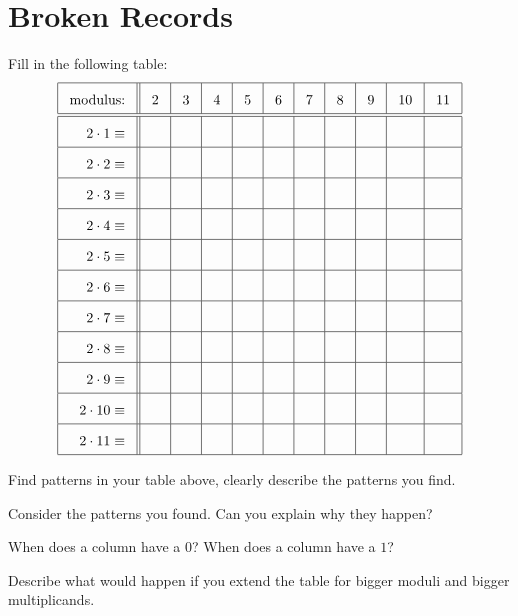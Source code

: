 \newpage
\section{Broken Records}\label{A:orderMod}

Fill in the following table:
\[
{\renewcommand{\arraystretch}{1.8}
\renewcommand{\arraycolsep}{3mm}
\begin{array}{|r||c|c|c|c|c|c|c|c|c|c|}\hline
\text{modulus:} & 2 & 3 & 4 & 5 & 6 & 7 & 8 & 9 & 10 & 11 \\ \hline\hline
2\cdot 1 \equiv & & & & & & & & & & \\ \hline
2\cdot 2 \equiv & & & & & & & & & & \\ \hline
2\cdot 3 \equiv & & & & & & & & & & \\ \hline
2\cdot 4 \equiv & & & & & & & & & & \\ \hline
2\cdot 5 \equiv & & & & & & & & & & \\ \hline
2\cdot 6 \equiv & & & & & & & & & & \\ \hline
2\cdot 7 \equiv & & & & & & & & & & \\ \hline
2\cdot 8 \equiv & & & & & & & & & & \\ \hline
2\cdot 9 \equiv & & & & & & & & & & \\ \hline
2\cdot 10\equiv & & & & & & & & & & \\ \hline
2\cdot 11\equiv & & & & & & & & & & \\ \hline
\end{array}}
\]

\begin{prob} 
Find patterns in your table above, clearly describe the patterns you find.
\end{prob}

\begin{prob} 
Consider the patterns you found. Can you explain why they happen?
\end{prob}

\begin{prob}
When does a column have a $0$? When does a column have a $1$? 
\end{prob}

\begin{prob}
Describe what would happen if you extend the table for bigger
moduli and bigger multiplicands.
\end{prob}


\vfill

\newpage


